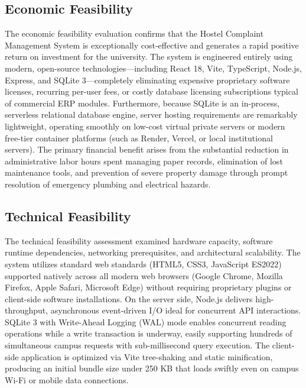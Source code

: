 \documentclass[10pt]{report}
\begin{document}
\subsection{Economic Feasibility}
\hspace{0.5cm}The economic feasibility evaluation confirms that the Hostel Complaint Management System is exceptionally cost-effective and generates a rapid positive return on investment for the university. The system is engineered entirely using modern, open-source technologies---including React 18, Vite, TypeScript, Node.js, Express, and SQLite 3---completely eliminating expensive proprietary software licenses, recurring per-user fees, or costly database licensing subscriptions typical of commercial ERP modules. Furthermore, because SQLite is an in-process, serverless relational database engine, server hosting requirements are remarkably lightweight, operating smoothly on low-cost virtual private servers or modern free-tier container platforms (such as Render, Vercel, or local institutional servers). The primary financial benefit arises from the substantial reduction in administrative labor hours spent managing paper records, elimination of lost maintenance tools, and prevention of severe property damage through prompt resolution of emergency plumbing and electrical hazards.

\subsection{Technical Feasibility}
\hspace{0.5cm}The technical feasibility assessment examined hardware capacity, software runtime dependencies, networking prerequisites, and architectural scalability. The system utilizes standard web standards (HTML5, CSS3, JavaScript ES2022) supported natively across all modern web browsers (Google Chrome, Mozilla Firefox, Apple Safari, Microsoft Edge) without requiring proprietary plugins or client-side software installations. On the server side, Node.js delivers high-throughput, asynchronous event-driven I/O ideal for concurrent API interactions. SQLite 3 with Write-Ahead Logging (WAL) mode enables concurrent reading operations while a write transaction is underway, easily supporting hundreds of simultaneous campus requests with sub-millisecond query execution. The client-side application is optimized via Vite tree-shaking and static minification, producing an initial bundle size under 250 KB that loads swiftly even on campus Wi-Fi or mobile data connections.
\end{document}
